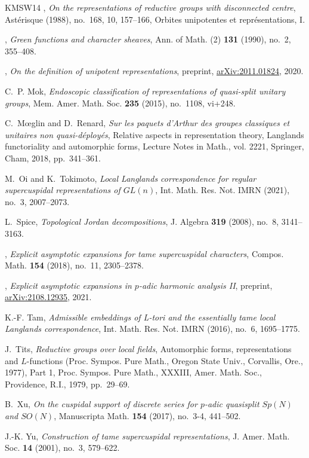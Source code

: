 \documentclass{amsart}
\theoremstyle{plain}
\theoremstyle{definition}
\theoremstyle{remark}
\theoremstyle{theorem}
\begin{document}
\begin{thebibliography}{KMSW14}
\bysame, \emph{On the representations of reductive groups with disconnected
  centre}, Ast\'{e}risque (1988), no.~168, 10, 157--166, Orbites unipotentes et
  repr\'{e}sentations, I.

\bysame, \emph{Green functions and character sheaves}, Ann. of Math. (2)
  \textbf{131} (1990), no.~2, 355--408.

\bysame, \emph{On the definition of unipotent representations}, preprint,
  \url{arXiv:2011.01824}, 2020.

C.~P. Mok, \emph{Endoscopic classification of representations of quasi-split
  unitary groups}, Mem. Amer. Math. Soc. \textbf{235} (2015), no.~1108, vi+248.

C.~M{\oe}glin and D.~Renard, \emph{Sur les paquets d'{A}rthur des groupes
  classiques et unitaires non quasi-d\'{e}ploy\'{e}s}, Relative aspects in
  representation theory, {L}anglands functoriality and automorphic forms,
  Lecture Notes in Math., vol. 2221, Springer, Cham, 2018, pp.~341--361.

M.~Oi and K.~Tokimoto, \emph{Local {L}anglands correspondence for regular
  supercuspidal representations of {$GL(n)$}}, Int. Math. Res. Not. IMRN
  (2021), no.~3, 2007--2073.

L.~Spice, \emph{Topological {J}ordan decompositions}, J. Algebra \textbf{319}
  (2008), no.~8, 3141--3163.

\bysame, \emph{Explicit asymptotic expansions for tame supercuspidal
  characters}, Compos. Math. \textbf{154} (2018), no.~11, 2305--2378.

\bysame, \emph{Explicit asymptotic expansions in {$p$}-adic harmonic analysis
  {II}}, preprint, \url{arXiv:2108.12935}, 2021.

K.-F. Tam, \emph{Admissible embeddings of {L}-tori and the essentially tame
  local {L}anglands correspondence}, Int. Math. Res. Not. IMRN (2016), no.~6,
  1695--1775.

J.~Tits, \emph{Reductive groups over local fields}, Automorphic forms,
  representations and {$L$}-functions ({P}roc. {S}ympos. {P}ure {M}ath.,
  {O}regon {S}tate {U}niv., {C}orvallis, {O}re., 1977), {P}art 1, Proc. Sympos.
  Pure Math., XXXIII, Amer. Math. Soc., Providence, R.I., 1979, pp.~29--69.

B.~Xu, \emph{On the cuspidal support of discrete series for {$p$}-adic
  quasisplit {$Sp(N)$} and {$SO(N)$}}, Manuscripta Math. \textbf{154} (2017),
  no.~3-4, 441--502.

J.-K. Yu, \emph{Construction of tame supercuspidal representations}, J. Amer.
  Math. Soc. \textbf{14} (2001), no.~3, 579--622.

\end{thebibliography}
\end{document}
